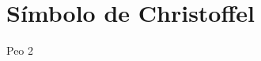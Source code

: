 \documentclass[../main_ej.tex]{subfiles}
\begin{document}
\section{Símbolo de Christoffel}
Peo 2
 
\end{document}
